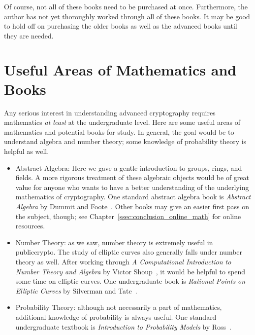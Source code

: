 \noindent
Of course, not all of these books need to be purchased at once.
Furthermore, the author has not yet thoroughly worked through
all of these books.
It may be good to hold off on purchasing the older books
as well as the advanced books until they are needed.



\section{Useful Areas of Mathematics and Books}

Any serious interest
in understanding advanced cryptography requires mathematics
\emph{at least} at the undergraduate level.
Here are some useful areas of mathematics and potential books for study.
In general, the goal would be to understand algebra and \gls{number theory};
some knowledge of probability theory is helpful as well.

\begin{itemize}
\item Abstract Algebra: Here we gave a gentle introduction
    to \glspl{group}, \glspl{ring}, and \glspl{field}.
    A more rigorous treatment of these algebraic objects would
    be of great value for anyone who wants to have a better understanding
    of the underlying mathematics of cryptography.
    One standard abstract algebra book is
    \emph{Abstract Algebra} by Dummit and Foote~\cite{DummitFooteAlgebra}.
    Other books may give an easier first pass on the subject, though;
    see Chapter~\ref{ssec:conclusion_online_math} for online resources.

\item Number Theory: as we saw, \gls{number theory} is extremely useful
    in \gls{publiccrypto}.
    The study of \glspl{elliptic curve} also generally falls under
    \gls{number theory} as well.
    After working through
    \emph{A Computational Introduction to Number Theory and Algebra}
    by Victor Shoup~\cite{ComputationalIntroNTA},
    it would be helpful to spend some time on \glspl{elliptic curve}.
    One undergraduate book is \emph{Rational Points on Elliptic Curves} by
    Silverman and Tate~\cite{RationalPointsEC}.
\item Probability Theory: although not necessarily a part of mathematics,
    additional knowledge of probability is always useful.
    One standard undergraduate textbook is
    \emph{Introduction to Probability Models} by Ross~\cite{IntroProbModels}.
\end{itemize}


